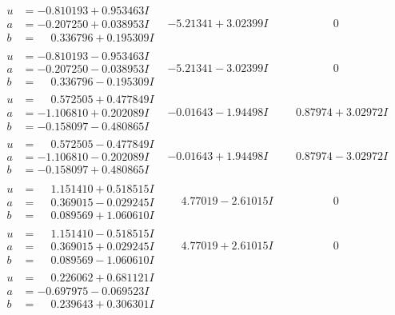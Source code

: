\documentclass[1p]{elsarticle_modified}
\theoremstyle{definition}
\begin{document}
$$\begin{array}{c|c|c}
\begin{aligned}
u &= -0.810193 + 0.953463 I \\
a &= -0.207250 + 0.038953 I \\
b &= \phantom{-}0.336796 + 0.195309 I\end{aligned}
 & -5.21341 + 3.02399 I & \phantom{-0.000000 } 0 \\ \hline\begin{aligned}
u &= -0.810193 - 0.953463 I \\
a &= -0.207250 - 0.038953 I \\
b &= \phantom{-}0.336796 - 0.195309 I\end{aligned}
 & -5.21341 - 3.02399 I & \phantom{-0.000000 } 0 \\ \hline\begin{aligned}
u &= \phantom{-}0.572505 + 0.477849 I \\
a &= -1.106810 + 0.202089 I \\
b &= -0.158097 - 0.480865 I\end{aligned}
 & -0.01643 - 1.94498 I & \phantom{-}0.87974 + 3.02972 I \\ \hline\begin{aligned}
u &= \phantom{-}0.572505 - 0.477849 I \\
a &= -1.106810 - 0.202089 I \\
b &= -0.158097 + 0.480865 I\end{aligned}
 & -0.01643 + 1.94498 I & \phantom{-}0.87974 - 3.02972 I \\ \hline\begin{aligned}
u &= \phantom{-}1.151410 + 0.518515 I \\
a &= \phantom{-}0.369015 - 0.029245 I \\
b &= \phantom{-}0.089569 + 1.060610 I\end{aligned}
 & \phantom{-}4.77019 - 2.61015 I & \phantom{-0.000000 } 0 \\ \hline\begin{aligned}
u &= \phantom{-}1.151410 - 0.518515 I \\
a &= \phantom{-}0.369015 + 0.029245 I \\
b &= \phantom{-}0.089569 - 1.060610 I\end{aligned}
 & \phantom{-}4.77019 + 2.61015 I & \phantom{-0.000000 } 0 \\ \hline\begin{aligned}
u &= \phantom{-}0.226062 + 0.681121 I \\
a &= -0.697975 - 0.069523 I \\
b &= \phantom{-}0.239643 + 0.306301 I\end{aligned}

\end{array}$$
\end{document}
